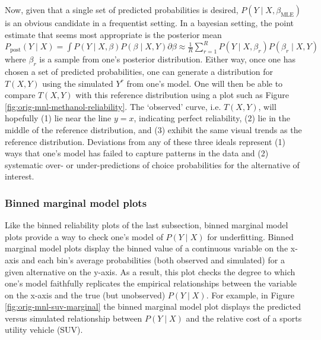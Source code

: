 \documentclass[preprint]{elsarticle}
\begin{document}
Now, given that a single set of predicted probabilities is desired, $P \left( Y \mid X, \beta _{\textrm{MLE}} \right)$ is an obvious candidate in a frequentist setting. In a bayesian setting, the point estimate that seems most appropriate is the posterior mean $P_{\textrm{post}} \left( Y \mid X \right) = \int P \left( Y \mid X, \beta \right) P \left( \beta \mid X, Y \right) \partial \beta \approx \frac{1}{R} \sum _{r=1} ^R P \left( Y \mid X, \beta_r \right) P \left( \beta_r \mid X, Y \right)$ where $\beta_r$ is a sample from one's posterior distribution. Either way, once one has chosen a set of predicted probabilities, one can generate a distribution for $T \left( X, Y \right)$ using the simulated $Y^r$ from one's model. One will then be able to compare $T \left( X, Y \right)$ with this reference distribution using a plot such as Figure \ref{fig:orig-mnl-methanol-reliability}. The `observed' curve, i.e. $T \left( X, Y \right)$, will hopefully (1) lie near the line $y = x$, indicating perfect reliability, (2) lie in the middle of the reference distribution, and (3) exhibit the same visual trends as the reference distribution. Deviations from any of these three ideals represent (1) ways that one's model has failed to capture patterns in the data and (2) systematic over- or under-predictions of choice probabilities for the alternative of interest.

\subsubsection{Binned marginal model plots}
\label{sec:case1-part1-mm-plots}
Like the binned reliability plots of the last subsection, binned marginal model plots provide a way to check one's model of $P \left( Y \mid X \right)$ for underfitting. Binned marginal model plots display the binned value of a continuous variable on the x-axis and each bin's average probabilities (both observed and simulated) for a given alternative on the y-axis. As a result, this plot checks the degree to which one's model faithfully replicates the empirical relationships between the variable on the x-axis and the true (but unobserved) $P \left( Y \mid X \right)$. For example, in Figure	\ref{fig:orig-mnl-suv-marginal} the binned marginal model plot displays the predicted versus simulated relationship between $P \left( Y \mid X \right)$ and the relative cost of a sports utility vehicle (SUV).
\end{document}
